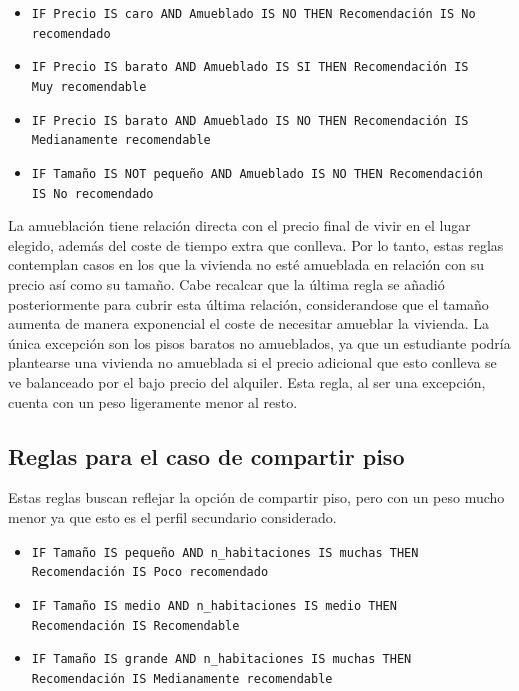 \documentclass[12pt]{report} %
\begin{document}
    \begin{itemize}
        \item \texttt{IF Precio IS caro AND Amueblado IS NO THEN Recomendación IS No\\recomendado}
        \item \texttt{IF Precio IS barato AND Amueblado IS SI THEN Recomendación IS\\Muy recomendable}
        \item \texttt{IF Precio IS barato AND Amueblado IS NO THEN Recomendación IS\\Medianamente recomendable}
        \item \texttt{IF Tamaño IS NOT pequeño AND Amueblado IS NO THEN Recomendación\\IS No recomendado}
    \end{itemize}

    La amueblación tiene relación directa con el precio final de vivir en el lugar elegido, 
    además del coste de tiempo extra que conlleva. Por lo tanto, estas reglas contemplan casos en 
    los que la vivienda no esté amueblada en relación con su precio así como su tamaño. Cabe recalcar
    que la última regla se añadió posteriormente para cubrir esta última relación, considerandose que el 
    tamaño aumenta de manera exponencial el coste de necesitar amueblar la vivienda. La única excepción
    son los pisos baratos no amueblados, ya que un estudiante podría plantearse una vivienda no amueblada 
    si el precio adicional que esto conlleva se ve balanceado por el bajo precio del alquiler. Esta regla, 
    al ser una excepción, cuenta con un peso ligeramente menor al resto. 

    \subsection{Reglas para el caso de compartir piso}
    Estas reglas buscan reflejar la opción de compartir piso, pero con un peso mucho menor ya que esto 
    es el perfil secundario considerado. 

    \begin{itemize}
        \item \texttt{IF Tamaño IS pequeño AND n\_habitaciones IS muchas THEN\\Recomendación IS Poco recomendado}
        \item \texttt{IF Tamaño IS medio AND n\_habitaciones IS medio THEN\\Recomendación IS Recomendable}
        \item \texttt{IF Tamaño IS grande AND n\_habitaciones IS muchas THEN\\Recomendación IS Medianamente recomendable}
    \end{itemize}
\end{document}
